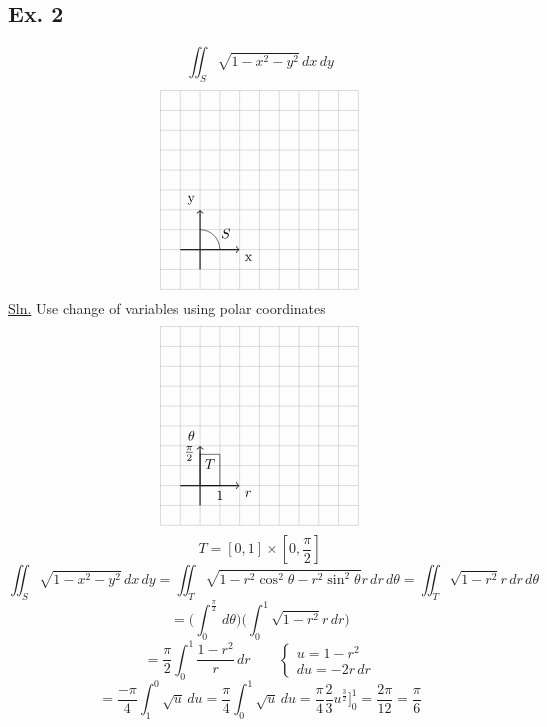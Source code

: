 \documentclass[12pt]{article}
\begin{document}
\subsection*{Ex. 2}
    \[ \iint_S\sqrt{1-x^2-y^2}\,dx\,dy \]
    \[ 
        \begin{tikzpicture}[scale=0.5]
            \draw[thick,->] (-1,0) -- (2,0) node[anchor=north west] {x};
            \draw[thick,->] (0,-1) -- (0,2) node[anchor=south east] {y};
            \draw[step=1cm,gray,very thin] (-2,-2) grid (8,8);
            \draw (1, 0) arc (0:90:1);
            \draw (1.3,1.3) node[anchor=north]{$S$};
        \end{tikzpicture}
    \]
    \underline{Sln.} Use change of variables using polar coordinates \\
    \[
        \begin{tikzpicture}[scale=0.5]
            \draw[thick,->] (-1,0) -- (2,0) node[anchor=north west] {$r$};
            \draw[thick,->] (0,-1) -- (0,2) node[anchor=south east] {$\theta$};
            \draw[step=1cm,gray,very thin] (-2,-2) grid (8,8);
            \draw (0, 0) rectangle (1, pi/2);
            \draw (.5,pi/2) node[anchor=north]{$T$};
            \draw (1pt,1.62 cm) -- (-1pt,1.62 cm) node[anchor=east] {$\frac{\pi}{2}$};
            \draw (1 cm,1pt) -- (1 cm,-1pt) node[anchor=north] {$1$};
        \end{tikzpicture}
    \]
    \[ T=[0,1]\times[0,\frac{\pi}{2}] \]
    \[ \iint_S\sqrt{1-x^2-y^2}\,dx\,dy=\iint_T\sqrt{1-r^2\cos^2\theta-r^2\sin^2\theta}r\,dr\,d\theta=\iint_T\sqrt{1-r^2}r\,dr\,d\theta \]
    \[ = \bigg(\int_0^{\frac{\pi}{2}}\,d\theta\bigg)\bigg(\int_0^1\sqrt{1-r^2}r\,dr\bigg) \]
    \[ 
        = \frac{\pi}{2}\int_0^1\frac{1-r^2}r\,dr\quad\quad 
        \begin{cases}
            u=1-r^2 \\
            du=-2r\,dr
        \end{cases}
    \]
    \[ =\frac{-\pi}{4}\int_1^0\sqrt{u}\,du=\frac{\pi}{4}\int_0^1\sqrt{u}\,du=\frac{\pi}{4}\frac{2}{3}u^{\frac{3}{2}}\bigg]_0^1=\frac{2\pi}{12}=\frac{\pi}{6} \]
\end{document}
